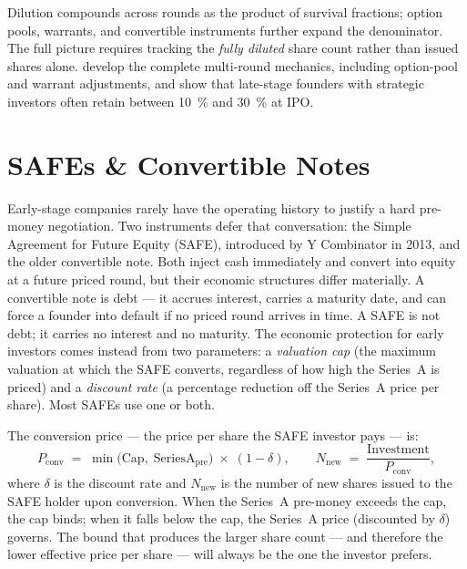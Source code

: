 Dilution compounds across rounds as the product of survival fractions; option pools, warrants,
and convertible instruments further expand the denominator. The full picture requires tracking
the \emph{fully diluted} share count rather than issued shares alone.
\textcite{metrick2021venture} develop the complete multi-round mechanics, including option-pool
and warrant adjustments, and show that late-stage founders with strategic investors often
retain between \qty{10}{\percent} and \qty{30}{\percent} at IPO.

\section{SAFEs \& Convertible Notes}\label{sec:safes-convertibles}

Early-stage companies rarely have the operating history to justify a hard pre-money
negotiation. Two instruments defer that conversation: the Simple Agreement for Future Equity
(SAFE), introduced by Y Combinator in 2013, and the older convertible note. Both inject cash
immediately and convert into equity at a future priced round, but their economic structures
differ materially. A convertible note is debt --- it accrues interest, carries a maturity
date, and can force a founder into default if no priced round arrives in time. A SAFE is not
debt; it carries no interest and no maturity. The economic protection for early investors
comes instead from two parameters: a \emph{valuation cap} (the maximum valuation at which
the SAFE converts, regardless of how high the Series~A is priced) and a \emph{discount rate}
(a percentage reduction off the Series~A price per share). Most SAFEs use one or both.

The conversion price --- the price per share the SAFE investor pays --- is:
\begin{equation}\label{eq:safe-conversion}
  P_{\mathrm{conv}}
  \;=\; \min\!\bigl(\mathrm{Cap},\;\mathrm{SeriesA}_{\mathrm{pre}}\bigr)
        \;\times\; (1 - \delta),
  \qquad
  N_{\mathrm{new}}
  \;=\; \frac{\mathrm{Investment}}{P_{\mathrm{conv}}},
\end{equation}
where \(\delta\) is the discount rate and \(N_{\mathrm{new}}\) is the number of new shares
issued to the SAFE holder upon conversion. When the Series~A pre-money exceeds the cap, the
cap binds; when it falls below the cap, the Series~A price (discounted by \(\delta\)) governs.
The bound that produces the larger share count --- and therefore the lower effective price per
share --- will always be the one the investor prefers.

